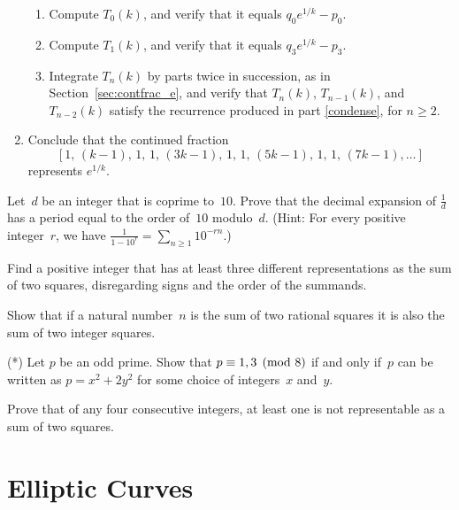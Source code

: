 \begin{exercises}
\begin{enumerate}
\begin{enumerate}
\item
Compute $T_0(k)$, and verify that it equals $q_0e^{1/k}-p_0$.
\item
Compute $T_1(k)$, and verify that it equals $q_3e^{1/k}-p_3$.
\item
Integrate $T_n(k)$ by parts twice in succession, as in
Section~\ref{sec:contfrac_e}, and verify that $T_n(k)$, $T_{n-1}(k)$, and $T_{n-2}(k)$ satisfy the recurrence produced in part \ref{condense}, for $n\geq2$.
\end{enumerate}

\item
Conclude that the continued fraction
$$
  [1,\,(k-1),\,1,\,1,\,(3k-1),\,1,\,1,\,(5k-1),\,1,\,1,\,(7k-1),\ldots]
$$
 represents $e^{1/k}$.
\end{enumerate}


\item \label{ex:decexpord}
Let~$d$ be an integer that is coprime to~$10$.
Prove that the decimal expansion of $\frac{1}{d}$ has a period
equal to the order of~$10$ modulo~$d$.
(Hint: For every positive integer~$r$,  we have
$
  \frac{1}{1-10^r} = \sum_{n\geq 1} 10^{-rn}.
$)


\item\label{ex:qf3} Find a positive integer that has at least three
  different representations as the sum of two squares, disregarding
  signs and the order of the summands.

\item\label{ex:qf4} Show that if a natural number~$n$ is the sum of two
  rational squares it is also the sum of two integer squares.

\item\label{ex:qf5}(*) Let $p$ be an odd prime.  Show that $p\equiv
  1,3\pmod{8}$ if and only if~$p$ can be written as $p=x^2 + 2y^2$ for
  some choice of integers~$x$ and~$y$.

\item\label{ex:qf7} Prove that of any four consecutive integers, at
  least one is not representable as a sum of two squares.

\end{exercises}



\chapter{Elliptic Curves}\label{ch:ec}

